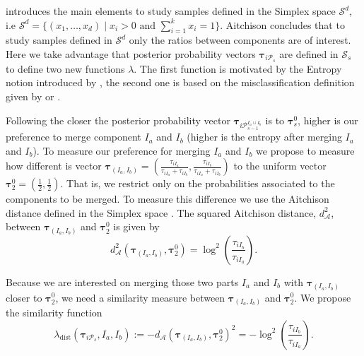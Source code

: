 \documentclass[submit]{smj}
\theoremstyle{definition}
\newcommand{\m}[1]{\boldsymbol{#1}}
\begin{document}
\cite{aitchison1986statistical} introduces the main elements to study samples defined in the Simplex space $\mathcal{S}^d$, i.e $\mathcal{S}^d = \{ (x_1,\dots, x_d) \;|\; x_i > 0 \text{ and } \sum_{i=1}^k x_i = 1 \}$. Aitchison concludes that to study samples defined in $\mathcal{S}^d$ only the ratios between components are of interest. Here we take advantage that posterior probability vectors $\m\tau_{i\mathcal{P}_s}$ are defined in $\mathcal{S}_s$ to define two new functions $\lambda$. The first function is motivated by the Entropy notion introduced by \cite{baudry2010combining}, the second one is based on the misclassification definition given by  \cite{hennig2010methods} or \cite{longford2014}.


Following \cite{baudry2010combining} the closer the posterior probability vector $\m\tau_{i \mathcal{P}_{s-1}^{I_a\cup I_b}}$ is to $\m\tau_s^0$, higher is our preference to merge component $I_a$ and $I_b$ (higher is the entropy after merging $I_a$ and $I_b$). To measure our preference for merging $I_a$ and $I_b$ we propose to measure how different is vector $\m\tau_{\left(I_a, I_b\right)} = (\frac{\tau_{i I_a}}{\tau_{i I_a} + \tau_{i I_b}}, \frac{\tau_{i I_b}}{\tau_{i I_a} + \tau_{i I_b}})$ to the uniform vector $\m\tau_2^0=\left(\frac{1}{2}, \frac{1}{2}\right)$. That is, we restrict only on the probabilities associated to the components to be merged. To measure this difference we use the Aitchison distance defined in the Simplex space  \citep{palarea2012dealing}. The squared Aitchison distance, $d_\mathcal{A}^2$, between $\m\tau_{\left(I_a, I_b\right)}$ and $\m\tau_2^0$ is given by
\[
d_\mathcal{A}^2\left(\m\tau_{\left(I_a, I_b\right)}, \m\tau_2^0 \right) = \log^2 \left(\frac{ \tau_{iI_b} }{ \tau_{iI_a} }\right).
\]

Because we are interested on merging those two parts  $I_a$ and $I_b$ with $\m\tau_{\left(I_a, I_b\right)}$ closer to $\m\tau_2^0$, we need a similarity measure between $\m\tau_{\left(I_a, I_b\right)}$ and $\m\tau_2^0$. We propose the similarity function
\[
\lambda_{\text{dist}}(\m\tau_{i \mathcal{P}_s},  I_a,  I_b) := -d_\mathcal{A}\left(\m\tau_{\left(I_a, I_b\right)}, \m\tau_2^0 \right)^2 = -\log^2 \left(\frac{ \tau_{iI_b} }{ \tau_{iI_a} }\right).
\]
\end{document}
